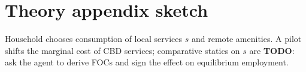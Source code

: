 \documentclass[11pt]{article}
\begin{document}
\section*{Theory appendix sketch}
Household chooses consumption of local services $s$ and remote amenities.
A pilot shifts the marginal cost of CBD services; comparative statics on $s$ are
\textbf{TODO}: ask the agent to derive FOCs and sign the effect on equilibrium employment.
\end{document}
